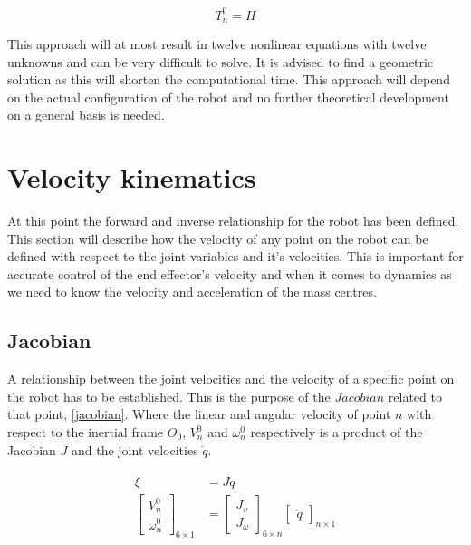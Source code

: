 \begin{equation}\label{inverse_kin}
T^0_n = H
\end{equation}

This approach will at most result in twelve nonlinear equations with twelve unknowns and can be very difficult to solve. It is advised to find a geometric solution as this will shorten the computational  time. This approach will depend on the actual configuration of the robot and no further theoretical development on a general basis is needed.

\section{Velocity kinematics}
At this point the forward and inverse relationship for the robot has been defined. This section will describe how the velocity of any point on the robot can be defined with respect to the joint variables and it's velocities. This is important for accurate control of the end effector's velocity and when it comes to 
dynamics as we need to know the velocity and acceleration of the mass centres.
\subsection{Jacobian}

A relationship between the joint velocities and the velocity of a specific point on the robot has to be established. This is the purpose of the $Jacobian$ related to that point, \eqref{jacobian}. Where the linear and angular velocity of point $n$ with respect to the inertial frame $O_0$, $V^0_n$ and $\omega^0_n$ respectively is a product of the Jacobian $J$ and the joint velocities $\dot{q}$. 

\begin{align}\label{jacobian}
\begin{split}
\xi &= J\dot{q}\\
\begin{bmatrix}
V^0_n\\ 
\omega^0_n
\end{bmatrix}_{6\times 1}
&=
\begin{bmatrix}
J_v\\ 
J_\omega
\end{bmatrix}_{6\times n} \begin{bmatrix}
\dot{q}
\end{bmatrix}_{n\times 1}
\end{split}
\end{align}

